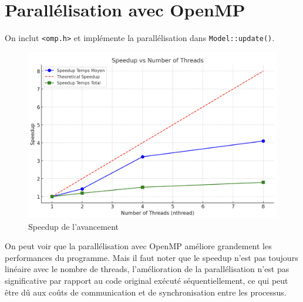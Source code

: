 \section{Parallélisation avec OpenMP}
On inclut \texttt{<omp.h>} et implémente la parallélisation dans \texttt{Model::update()}.
\begin{table}[h]
    \centering
    \caption{Résultat de la parallélisation avec OpenMP}
    \label{tab:mytable}
\end{table}
\begin{figure}[h]
    \centering
    \includegraphics[width=0.9\linewidth, height=0.5\textwidth]{speedup_openmp.png}
    \caption{Speedup de l'avancement}
    \label{fig:enter-label}
\end{figure}
\par
On peut voir que la parallélisation avec OpenMP améliore grandement les performances du programme. Mais il faut noter que le speedup n'est pas toujours linéaire avec le nombre de threads, l’amélioration de la parallélisation n’est pas significative par rapport au code original exécuté séquentiellement, ce qui peut être dû aux coûts de communication et de synchronisation entre les processus.